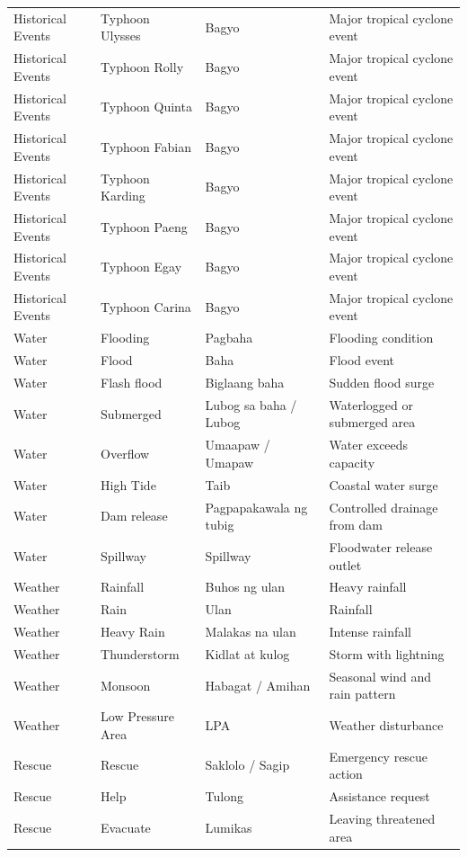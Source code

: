 \documentclass[12pt,a4paper]{report}
\begin{document}
\begin{longtable}{@{}p{} p{} p{} p{}@{}}
	Historical Events & Typhoon Ulysses & Bagyo & Major tropical cyclone event \\
	Historical Events & Typhoon Rolly & Bagyo & Major tropical cyclone event \\
	Historical Events & Typhoon Quinta & Bagyo & Major tropical cyclone event \\
	Historical Events & Typhoon Fabian & Bagyo & Major tropical cyclone event \\
	Historical Events & Typhoon Karding & Bagyo & Major tropical cyclone event \\
	Historical Events & Typhoon Paeng & Bagyo & Major tropical cyclone event \\
	Historical Events & Typhoon Egay & Bagyo & Major tropical cyclone event \\
	Historical Events & Typhoon Carina & Bagyo & Major tropical cyclone event \\
	Water & Flooding & Pagbaha & Flooding condition \\
	Water & Flood & Baha & Flood event \\
	Water & Flash flood & Biglaang baha & Sudden flood surge \\
	Water & Submerged & Lubog sa baha / Lubog & Waterlogged or submerged area \\
	Water & Overflow & Umaapaw / Umapaw & Water exceeds capacity \\
	Water & High Tide & Taib & Coastal water surge \\
	Water & Dam release & Pagpapakawala ng tubig & Controlled drainage from dam \\
	Water & Spillway & Spillway & Floodwater release outlet \\
	Weather & Rainfall & Buhos ng ulan & Heavy rainfall \\
	Weather & Rain & Ulan & Rainfall \\
	Weather & Heavy Rain & Malakas na ulan & Intense rainfall \\
	Weather & Thunderstorm & Kidlat at kulog & Storm with lightning \\
	Weather & Monsoon & Habagat / Amihan & Seasonal wind and rain pattern \\
	Weather & Low Pressure Area & LPA & Weather disturbance \\
	Rescue & Rescue & Saklolo / Sagip & Emergency rescue action \\
	Rescue & Help & Tulong & Assistance request \\
	Rescue & Evacuate & Lumikas & Leaving threatened area \\

\end{longtable}
\end{document}
